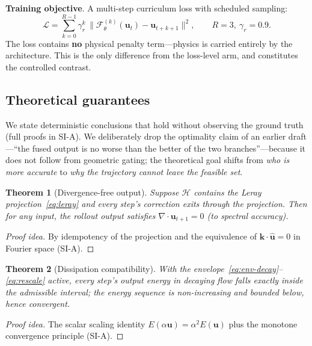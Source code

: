 \documentclass[11pt,a4paper]{article}
\newtheorem{theorem}{Theorem}
\newcommand{\bu}{\bm{u}}
\newcommand{\cF}{\mathcal{F}}
\newcommand{\cH}{\mathcal{H}}
\newcommand{\Ex}{E}
\begin{document}
\textbf{Training objective}. A multi-step curriculum loss with scheduled sampling:
\begin{equation}
\mathcal{L}=\sum_{k=0}^{R-1}\gamma_r^{k}\,\big\|\cF_\theta^{(k)}(\bu_t)-\bu_{t+k+1}\big\|^2,\qquad R=3,\ \gamma_r=0.9 .
\label{eq:loss}
\end{equation}
The loss contains \textbf{no} physical penalty term---physics is carried entirely by the architecture. This is the only difference from the loss-level arm, and constitutes the controlled contrast.

\subsection{Theoretical guarantees}\label{sec:theory}

We state deterministic conclusions that hold without observing the ground truth (full proofs in SI-A). We deliberately drop the optimality claim of an earlier draft---``the fused output is no worse than the better of the two branches''---because it does not follow from geometric gating; the theoretical goal shifts from \emph{who is more accurate} to \emph{why the trajectory cannot leave the feasible set}.

\begin{theorem}[Divergence-free output]\label{thm:div}
Suppose $\cH$ contains the Leray projection~\eqref{eq:leray} and every step's correction exits through the projection. Then for any input, the rollout output satisfies $\nabla\!\cdot\!\bu_{t+1}=0$ (to spectral accuracy).
\end{theorem}
\begin{proof}[Proof idea]
By idempotency of the projection and the equivalence of $\bm{k}\cdot\widehat{\bu}=0$ in Fourier space (SI-A).
\end{proof}

\begin{theorem}[Dissipation compatibility]\label{thm:energy}
With the envelope~\eqref{eq:env-decay}--\eqref{eq:rescale} active, every step's output energy in decaying flow falls exactly inside the admissible interval; the energy sequence is non-increasing and bounded below, hence convergent.
\end{theorem}
\begin{proof}[Proof idea]
The scalar scaling identity $\Ex(\alpha\bu)=\alpha^2\Ex(\bu)$ plus the monotone convergence principle (SI-A).
\end{proof}
\end{document}
